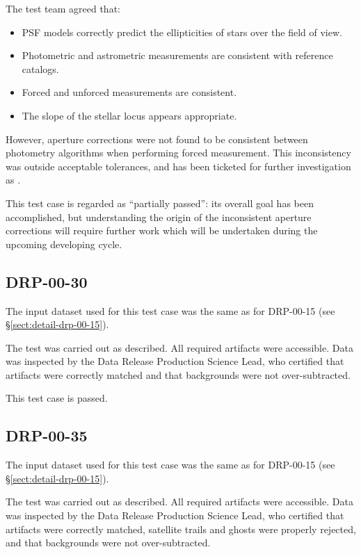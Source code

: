 \documentclass[DM,lsstdraft,STR,toc]{lsstdoc}
\begin{document}
The test team agreed that:

\begin{itemize}

  \item{PSF models correctly predict the ellipticities of stars over the field of view.}
  \item{Photometric and astrometric measurements are consistent with reference catalogs.}
  \item{Forced and unforced measurements are consistent.}
  \item{The slope of the stellar locus appears appropriate.}

\end{itemize}

However, aperture corrections were not found to be consistent between photometry algorithms when performing forced measurement.
This inconsistency was outside acceptable tolerances, and has been ticketed for further investigation as .

This test case is regarded as ``partially passed'': its overall goal has been accomplished, but understanding the origin of the inconsistent aperture corrections will require further work which will be undertaken during the upcoming developing cycle.

\subsection{DRP-00-30}
\label{sect:detail-drp-00-30}

The input dataset used for this test case was the same as for DRP-00-15 (see \S\ref{sect:detail-drp-00-15}).

The test was carried out as described.
All required artifacts were accessible.
Data was inspected by the Data Release Production Science Lead, who certified that artifacts were correctly matched and that backgrounds were not over-subtracted.

This test case is passed.




\subsection{DRP-00-35}
\label{sect:detail-drp-00-35}

The input dataset used for this test case was the same as for DRP-00-15 (see \S\ref{sect:detail-drp-00-15}).

The test was carried out as described.
All required artifacts were accessible.
Data was inspected by the Data Release Production Science Lead, who certified that artifacts were correctly matched, satellite trails and ghosts were properly rejected, and that backgrounds were not over-subtracted.
\end{document}
